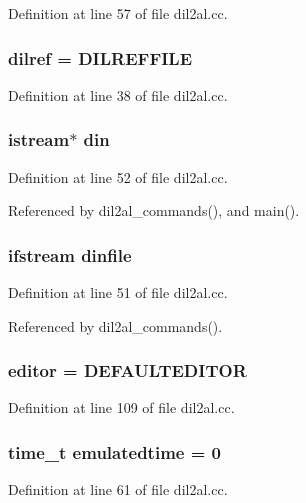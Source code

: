 Definition at line 57 of file dil2al.cc.
\subsubsection{ dilref = DILREFFILE}\label{dil2al_8cc_a12}




Definition at line 38 of file dil2al.cc.
\subsubsection{\setlength{\rightskip}{0pt plus 5cm}istream$\ast$ din}\label{dil2al_8cc_a26}




Definition at line 52 of file dil2al.cc.

Referenced by dil2al\_\-commands(), and main().
\subsubsection{\setlength{\rightskip}{0pt plus 5cm}ifstream dinfile}\label{dil2al_8cc_a25}




Definition at line 51 of file dil2al.cc.

Referenced by dil2al\_\-commands().
\subsubsection{ editor = DEFAULTEDITOR}\label{dil2al_8cc_a83}




Definition at line 109 of file dil2al.cc.
\subsubsection{\setlength{\rightskip}{0pt plus 5cm}time\_\-t emulatedtime = 0}\label{dil2al_8cc_a42}




Definition at line 61 of file dil2al.cc.

